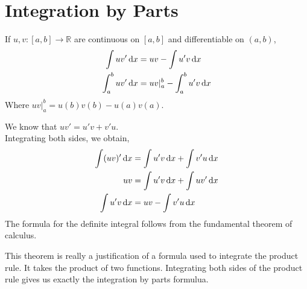 \documentclass[12pt]{article}
\begin{document}
\section{Integration by Parts}
\begin{theo}{}
If \(u, v: [a, b] \to \mathbb R\) are continuous on \([a, b]\) and differentiable on \((a, b)\),
\begin{align*}
    \displaystyle\int uv' \,\mathrm{d} x &= uv - \displaystyle\int u'v \,\mathrm{d} x\\
    \displaystyle\int_a^b uv' \,\mathrm{d} x &= uv\rvert_a^b - \displaystyle\int_a^b u'v \,\mathrm{d} x 
\end{align*}    
Where \(uv\rvert_a^b = u(b)v(b) - u(a)v(a)\).\\
\end{theo}
\begin{prf}{}
We know that \(uv' = u'v + v'u\).\\
Integrating both sides, we obtain,
\begin{align*}
    \displaystyle\int (uv)' \,\mathrm{d} x &= \displaystyle\int u'v\,\mathrm{d} x + \displaystyle\int v'u \,\mathrm{d} x\\
    uv &= \displaystyle\int u'v\,\mathrm{d} x + \displaystyle\int uv' \,\mathrm{d} x\\
    \displaystyle\int u'v \,\mathrm{d} x &= uv - \displaystyle\int v'u \,\mathrm{d} x
\end{align*}    
The formula for the definite integral follows from the fundamental theorem of calculus.\\
\end{prf}
\begin{explanation}{}
    This theorem is really a justification of a formula used to integrate the product rule. It takes the product of two functions. Integrating both sides of the product rule gives us exactly the integration by parts formulua.\\
\end{explanation}
\end{document}
